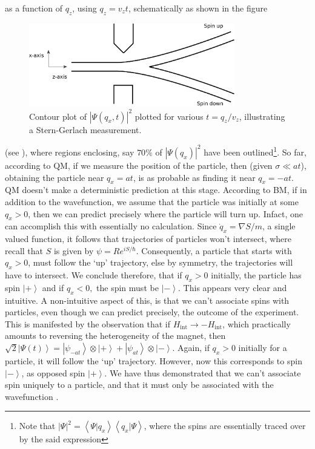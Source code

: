as a function of $q_{z}$, using $q_{z}=v_{z}t$, schematically as
shown in the figure 
\begin{figure}
\begin{centering}
\includegraphics[width=0.8\textwidth]{Chapter1/Figs/Vectors/sg}
\par\end{centering}

\caption{Contour plot of $\left|\Psi(q_{x},t)\right|^{2}$ plotted for various
$t=q_{z}/v_{z}$, illustrating a Stern-Gerlach measurement. \label{fig:Contour-plot-of-Psi}}


%
%
\end{figure}
(see ), where regions enclosing,
say $70\%$ of $\left|\Psi(q_{x})\right|^{2}$ have been outlined\footnote{Note that $\left|\Psi\right|^{2}=\left\langle \Psi|q_{x}\right\rangle \left\langle q_{x}|\Psi\right\rangle $,
where the spins are essentially traced over by the said expression}. So far, according to QM, if we measure the position of the particle,
then (given $\sigma\ll at$), obtaining the particle near $q_{x}=at$,
is as probable as finding it near $q_{x}=-at$. QM doesn't make a
deterministic prediction at this stage. According to BM, if in addition
to the wavefunction, we assume that the particle was initially at
some $q_{x}>0$, then we can predict precisely where the particle
will turn up. Infact, one can accomplish this with essentially no
calculation. Since $\dot{q}_{x}=\nabla S/m$, a single valued function,
it follows that trajectories of particles won't intersect, where recall
that $S$ is given by $\psi=Re^{iS/\hbar}$. Consequently, a particle
that starts with $q_{x}>0$, must follow the `up' trajectory, else
by symmetry, the trajectories will have to intersect. We conclude
therefore, that if $q_{x}>0$ initially, the particle has spin $\left|+\right\rangle $
and if $q_{x}<0,$ the spin must be $\left|-\right\rangle $. This
appears very clear and intuitive. A non-intuitive aspect of this,
is that we can't associate spins with particles, even though we can
predict precisely, the outcome of the experiment. This is manifested
by the observation that if $H_{\text{int}}\to-H_{\text{int}}$, which
practically amounts to reversing the heterogeneity of the magnet,
then $\sqrt{2}\left|\Psi(t)\right\rangle =\left|\psi_{-at}\right\rangle \otimes\left|+\right\rangle +\left|\psi_{at}\right\rangle \otimes\left|-\right\rangle $.
Again, if $q_{x}>0$ initially for a particle, it will follow the
`up' trajectory. However, now this corresponds to spin $\left|-\right\rangle $,
as opposed spin $\left|+\right\rangle $. We have thus demonstrated
that we can't associate spin uniquely to a particle, and that it must
only be associated with the wavefunction \cite{Detlef}. 

